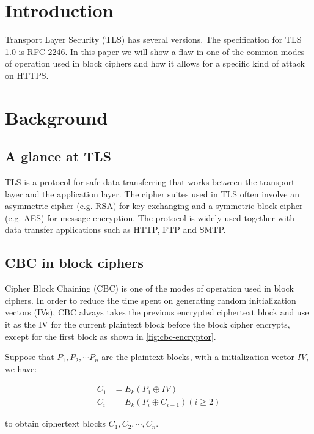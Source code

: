 \documentclass{acm_proc_article-sp}
\begin{document}

\section{Introduction}
Transport Layer Security (TLS) has several versions. The specification for TLS
1.0 is RFC 2246\cite{rfc2246}.
In this paper we will show a flaw in one of the common modes of operation used in block ciphers
and how it allows for a specific kind of attack\cite{beast} on HTTPS.

\section{Background}
\subsection{A glance at TLS}

TLS is a protocol for safe data transferring that works between the transport layer
and the application layer. The cipher suites used in TLS often involve an asymmetric cipher
(e.g. RSA) for key exchanging and a symmetric block cipher (e.g. AES) for message encryption.
The protocol is widely used together with data transfer applications such as HTTP, FTP and SMTP.

\subsection{CBC in block ciphers}
Cipher Block Chaining (CBC) is one of the modes of operation used in block ciphers.
In order to reduce the time spent on generating random initialization vectors (IVs), CBC always takes
the previous encrypted ciphertext block and use it as the IV for the current plaintext block before the
block cipher encrypts, except for the first block as shown in \ref{fig:cbc-encryptor}.

Suppose that $P_1,P_2,\cdots P_n$ are the plaintext blocks, with a initialization vector $IV$, we have:

$$
\begin{aligned}
C_1&=E_k(P_1\oplus IV)\\
C_i&=E_k(P_{i}\oplus C_{i-1}) (i\geq 2)
\end{aligned}
$$

to obtain ciphertext blocks $C_1,C_2,\cdots,C_n$.
\end{document}
